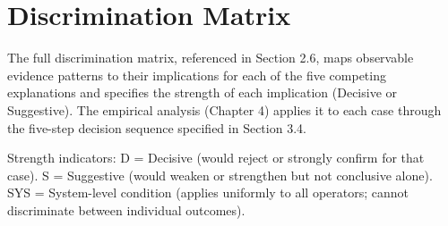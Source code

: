 \hypertarget{discrimination-matrix}{%
\chapter{Discrimination Matrix}\label{discrimination-matrix}}

The full discrimination matrix, referenced in Section 2.6, maps
observable evidence patterns to their implications for each of the five
competing explanations and specifies the strength of each implication
(Decisive or Suggestive). The empirical analysis (Chapter 4) applies it
to each case through the five-step decision sequence specified in
Section 3.4.

Strength indicators: D = Decisive (would reject or strongly confirm for
that case). S = Suggestive (would weaken or strengthen but not
conclusive alone). SYS = System-level condition (applies uniformly to
all operators; cannot discriminate between individual outcomes).

